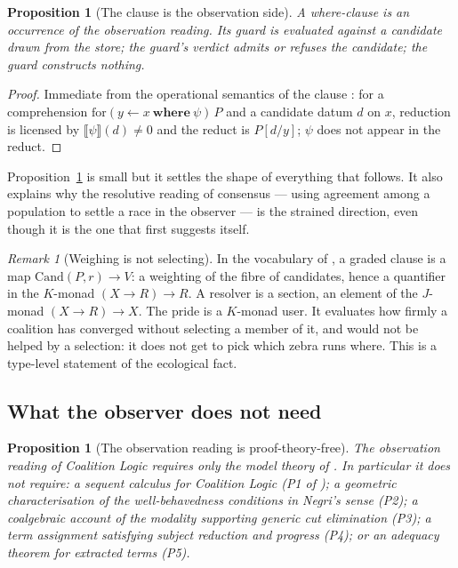 \documentclass[11pt,a4paper]{article}
\theoremstyle{plain}
\newtheorem{proposition}[theorem]{Proposition}
\theoremstyle{definition}
\theoremstyle{remark}
\newtheorem{remark}[theorem]{Remark}
\newcommand{\Val}{V}
\newcommand{\sem}[1]{\llbracket #1 \rrbracket}
\newcommand{\Cand}{\mathrm{Cand}}
\begin{document}
\begin{proposition}[The clause is the observation side]\label{prop:clauseside}
A \emph{where}-clause is an occurrence of the observation reading. Its guard is
evaluated against a candidate drawn from the store; the guard's verdict admits
or refuses the candidate; the guard constructs nothing.
\end{proposition}

\begin{proof}
Immediate from the operational semantics of the clause \cite{gradedwhere}: for
a comprehension $\mathrm{for}(y\leftarrow x\ \mathbf{where}\ \psi)\,P$ and a
candidate datum $d$ on $x$, reduction is licensed by
$\sem{\psi}(d) \neq 0$ and the reduct is $P[d/y]$; $\psi$ does not appear in
the reduct.
\end{proof}

Proposition~\ref{prop:clauseside} is small but it settles the shape of
everything that follows. It also explains why the resolutive reading of
consensus --- using agreement among a population to settle a race in the
observer --- is the strained direction, even though it is the one that first
suggests itself.

\begin{remark}[Weighing is not selecting]\label{rem:weighnotselect}
In the vocabulary of \cite{choicef}, a graded clause is a map
$\Cand(P,r)\to\Val$: a weighting of the fibre of candidates, hence a quantifier
in the $K$-monad $(X\to R)\to R$. A resolver is a section, an element of the
$J$-monad $(X\to R)\to X$. The pride is a $K$-monad user. It evaluates how
firmly a coalition has converged without selecting a member of it, and would
not be helped by a selection: it does not get to pick which zebra runs where.
This is a type-level statement of the ecological fact.
\end{remark}

\subsection{What the observer does not need}

\begin{proposition}[The observation reading is proof-theory-free]
\label{prop:pf-free}
The observation reading of Coalition Logic requires only the model theory of
\cite{GZ25}. In particular it does not require: a sequent calculus for
Coalition Logic (P1 of \cite{consensus}); a geometric characterisation of the
well-behavedness conditions in Negri's sense (P2); a coalgebraic account of the
modality supporting generic cut elimination (P3); a term assignment satisfying
subject reduction and progress (P4); or an adequacy theorem for extracted terms
(P5).
\end{proposition}
\end{document}
